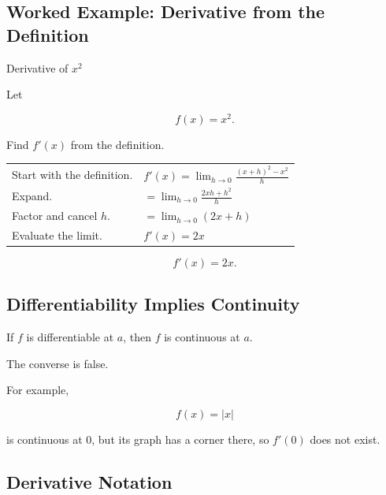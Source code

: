 \subsection{Worked Example: Derivative from the Definition}
\label{subsec:worked-derivative-definition}

\begin{workedexamplebox}{Derivative of \(x^2\)}

Let

\[ f(x)=x^2. \]

Find \(f'(x)\) from the definition.

\begin{tabularx}{\textwidth}{@{}>{\raggedright\arraybackslash}p{}X@{}}
Start with the definition. &
\(\displaystyle f'(x)=\lim_{h\to0}\frac{(x+h)^2-x^2}{h}\)\\
Expand. &
\(\displaystyle =\lim_{h\to0}\frac{2xh+h^2}{h}\)\\
Factor and cancel \(h\). &
\(\displaystyle =\lim_{h\to0}(2x+h)\)\\
Evaluate the limit. &
\(f'(x)=2x\)
\end{tabularx}

\begin{answerbox}
\[ \boxed{f'(x)=2x.} \]
\end{answerbox}
\end{workedexamplebox}

\subsection{Differentiability Implies Continuity}
\label{subsec:differentiability-continuity}

\begin{theorem}
If \(f\) is differentiable at \(a\), then \(f\) is continuous at \(a\).
\end{theorem}

The converse is false.

For example,

\[ f(x)=|x| \]

is continuous at \(0\), but its graph has a corner there, so \(f'(0)\) does
not exist.

\subsection{Derivative Notation}
\label{subsec:derivative-notation}

